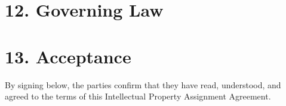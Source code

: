 \documentclass{paridyum}
\begin{document}
\section*{12. Governing Law}


\section*{13. Acceptance}
By signing below, the parties confirm that they have read, understood, and agreed to
the terms of this Intellectual Property Assignment Agreement.

\vspace{1.5em}
\paridyumsignblock

\vspace{1.5em}

\vspace{1.5em}
\end{document}
